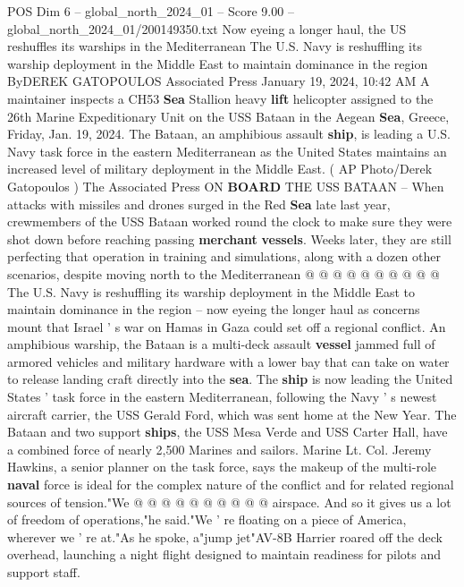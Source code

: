 \begin{textsample}{POS Dim 6 – global\_north\_2024\_01 – Score 9.00 – global\_north\_2024\_01/200149350.txt}  \label{ex:f6_pos_094}
Now eyeing a longer haul, the US reshuffles its warships in the Mediterranean The U.S.
Navy is reshuffling its warship deployment in the Middle East to maintain dominance in the region ByDEREK GATOPOULOS Associated Press January 19, 2024, 10:42 AM A maintainer inspects a CH53 \textbf{Sea} Stallion heavy \textbf{lift} helicopter assigned to the 26th Marine Expeditionary Unit on the USS Bataan in the Aegean \textbf{Sea}, Greece, Friday, Jan. 19, 2024.
The Bataan, an amphibious assault \textbf{ship}, is leading a U.S.
Navy task force in the eastern Mediterranean as the United States maintains an increased level of military deployment in the Middle East. ( AP Photo/Derek Gatopoulos ) The Associated Press ON \textbf{BOARD} THE USS BATAAN -- When attacks with missiles and drones surged in the Red \textbf{Sea} late last year, crewmembers of the USS Bataan worked round the clock to make sure they were shot down before reaching passing \textbf{merchant} \textbf{vessels}.
Weeks later, they are still perfecting that operation in training and simulations, along with a dozen other scenarios, despite moving north to the Mediterranean @ @ @ @ @ @ @ @ @ @ The U.S.
Navy is reshuffling its warship deployment in the Middle East to maintain dominance in the region -- now eyeing the longer haul as concerns mount that Israel ' s war on Hamas in Gaza could set off a regional conflict.
An amphibious warship, the Bataan is a multi-deck assault \textbf{vessel} jammed full of armored vehicles and military hardware with a lower bay that can take on water to release landing craft directly into the \textbf{sea}.
The \textbf{ship} is now leading the United States ' task force in the eastern Mediterranean, following the Navy ' s newest aircraft carrier, the USS Gerald Ford, which was sent home at the New Year.
The Bataan and two support \textbf{ships}, the USS Mesa Verde and USS Carter Hall, have a combined force of nearly 2,500 Marines and sailors.
Marine Lt.
Col.
Jeremy Hawkins, a senior planner on the task force, says the makeup of the multi-role \textbf{naval} force is ideal for the complex nature of the conflict and for related regional sources of tension."We @ @ @ @ @ @ @ @ @ @ airspace.
And so it gives us a lot of freedom of operations,"he said."We ' re floating on a piece of America, wherever we ' re at."As he spoke, a"jump jet"AV-8B Harrier roared off the deck overhead, launching a night flight designed to maintain readiness for pilots and support staff.

\end{textsample}
